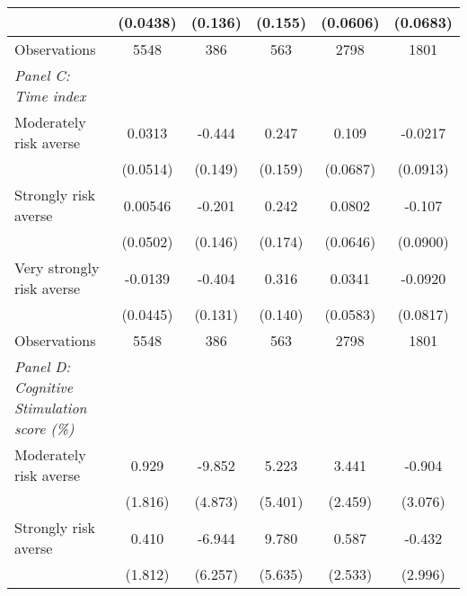 {\begin{tabular}{l*{5}{c}}
                    &    (0.0438)         &     (0.136)         &     (0.155)         &    (0.0606)         &    (0.0683)         \\
\midrule
Observations        &        5548         &         386         &         563         &        2798         &        1801         \\
\midrule
\textit{Panel C: Time index} & & & & & \\
Moderately risk averse&      0.0313         &      -0.444\sym{***}&       0.247         &       0.109         &     -0.0217         \\
                    &    (0.0514)         &     (0.149)         &     (0.159)         &    (0.0687)         &    (0.0913)         \\

Strongly risk averse&     0.00546         &      -0.201         &       0.242         &      0.0802         &      -0.107         \\
                    &    (0.0502)         &     (0.146)         &     (0.174)         &    (0.0646)         &    (0.0900)         \\

Very strongly risk averse&     -0.0139         &      -0.404\sym{***}&       0.316\sym{**} &      0.0341         &     -0.0920         \\
                    &    (0.0445)         &     (0.131)         &     (0.140)         &    (0.0583)         &    (0.0817)         \\
\midrule
Observations        &        5548         &         386         &         563         &        2798         &        1801         \\
\midrule
\textit{Panel D: Cognitive Stimulation score (\%)} & & & & & \\
Moderately risk averse&       0.929         &      -9.852\sym{**} &       5.223         &       3.441         &      -0.904         \\
                    &     (1.816)         &     (4.873)         &     (5.401)         &     (2.459)         &     (3.076)         \\

Strongly risk averse&       0.410         &      -6.944         &       9.780\sym{*}  &       0.587         &      -0.432         \\
                    &     (1.812)         &     (6.257)         &     (5.635)         &     (2.533)         &     (2.996)         \\


\end{tabular}}
